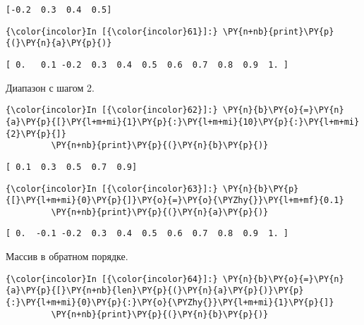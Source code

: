     \begin{Verbatim}[commandchars=\\\{\}]
[-0.2  0.3  0.4  0.5]

    \end{Verbatim}

    \begin{Verbatim}[commandchars=\\\{\}]
{\color{incolor}In [{\color{incolor}61}]:} \PY{n+nb}{print}\PY{p}{(}\PY{n}{a}\PY{p}{)}
\end{Verbatim}

    \begin{Verbatim}[commandchars=\\\{\}]
[ 0.   0.1 -0.2  0.3  0.4  0.5  0.6  0.7  0.8  0.9  1. ]

    \end{Verbatim}

    Диапазон с шагом 2.

    \begin{Verbatim}[commandchars=\\\{\}]
{\color{incolor}In [{\color{incolor}62}]:} \PY{n}{b}\PY{o}{=}\PY{n}{a}\PY{p}{[}\PY{l+m+mi}{1}\PY{p}{:}\PY{l+m+mi}{10}\PY{p}{:}\PY{l+m+mi}{2}\PY{p}{]}
         \PY{n+nb}{print}\PY{p}{(}\PY{n}{b}\PY{p}{)}
\end{Verbatim}

    \begin{Verbatim}[commandchars=\\\{\}]
[ 0.1  0.3  0.5  0.7  0.9]

    \end{Verbatim}

    \begin{Verbatim}[commandchars=\\\{\}]
{\color{incolor}In [{\color{incolor}63}]:} \PY{n}{b}\PY{p}{[}\PY{l+m+mi}{0}\PY{p}{]}\PY{o}{=}\PY{o}{\PYZhy{}}\PY{l+m+mf}{0.1}
         \PY{n+nb}{print}\PY{p}{(}\PY{n}{a}\PY{p}{)}
\end{Verbatim}

    \begin{Verbatim}[commandchars=\\\{\}]
[ 0.  -0.1 -0.2  0.3  0.4  0.5  0.6  0.7  0.8  0.9  1. ]

    \end{Verbatim}

    Массив в обратном порядке.

    \begin{Verbatim}[commandchars=\\\{\}]
{\color{incolor}In [{\color{incolor}64}]:} \PY{n}{b}\PY{o}{=}\PY{n}{a}\PY{p}{[}\PY{n+nb}{len}\PY{p}{(}\PY{n}{a}\PY{p}{)}\PY{p}{:}\PY{l+m+mi}{0}\PY{p}{:}\PY{o}{\PYZhy{}}\PY{l+m+mi}{1}\PY{p}{]}
         \PY{n+nb}{print}\PY{p}{(}\PY{n}{b}\PY{p}{)}
\end{Verbatim}

